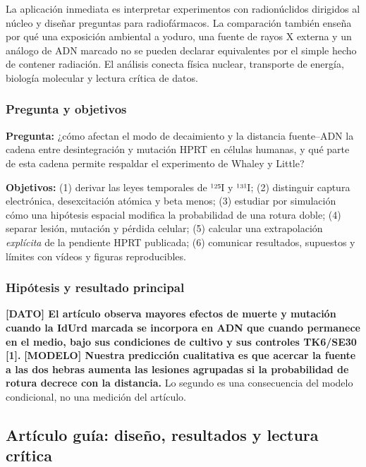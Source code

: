 \documentclass[11pt,a4paper,oneside]{article}
\begin{document}
La aplicación inmediata es interpretar experimentos con radionúclidos dirigidos al núcleo y diseñar preguntas para radiofármacos. La comparación también enseña por qué una exposición ambiental a yoduro, una fuente de rayos X externa y un análogo de ADN marcado no se pueden declarar equivalentes por el simple hecho de contener radiación. El análisis conecta física nuclear, transporte de energía, biología molecular y lectura crítica de datos.

\subsubsection{Pregunta y objetivos}\label{pregunta-y-objetivos}

\textbf{Pregunta:} ¿cómo afectan el modo de decaimiento y la distancia fuente--ADN la cadena entre desintegración y mutación HPRT en células humanas, y qué parte de esta cadena permite respaldar el experimento de Whaley y Little?

\textbf{Objetivos:} (1) derivar las leyes temporales de ¹²⁵I y ¹³¹I; (2) distinguir captura electrónica, desexcitación atómica y beta menos; (3) estudiar por simulación cómo una hipótesis espacial modifica la probabilidad de una rotura doble; (4) separar lesión, mutación y pérdida celular; (5) calcular una extrapolación \emph{explícita} de la pendiente HPRT publicada; (6) comunicar resultados, supuestos y límites con vídeos y figuras reproducibles.

\subsubsection{Hipótesis y resultado principal}\label{hipuxf3tesis-y-resultado-principal}

\textbf{{[}DATO{]} El artículo observa mayores efectos de muerte y mutación cuando la IdUrd marcada se incorpora en ADN que cuando permanece en el medio, bajo sus condiciones de cultivo y sus controles TK6/SE30 {[}1{]}.} \textbf{{[}MODELO{]} Nuestra predicción cualitativa es que acercar la fuente a las dos hebras aumenta las lesiones agrupadas si la probabilidad de rotura decrece con la distancia.} Lo segundo es una consecuencia del modelo condicional, no una medición del artículo.

\subsection{Artículo guía: diseño, resultados y lectura crítica}\label{artuxedculo-guuxeda-diseuxf1o-resultados-y-lectura-cruxedtica}
\end{document}
